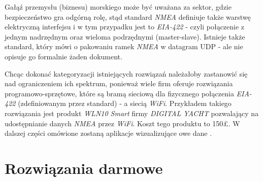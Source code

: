 \documentclass[skorowidz,skroty]{dyplomWEZUT}
\begin{document}
Gałąź przemysłu (biznesu) morskiego może być uważana za sektor, gdzie bezpieczeństwo gra odgórną rolę, stąd standard \textit{NMEA} definiuje także warstwę elektryczną interfejsu i w tym przypadku jest to \textit{EIA-422} - czyli połączenie z jednym nadrzędnym oraz wieloma podrzędnymi (master-slave). Istnieje także standard, który mówi o pakowaniu ramek \textit{NMEA} w datagram UDP - ale nie opisuje go formalnie żaden dokument.

Chcąc dokonać kategoryzacji istniejących rozwiązań należałoby zastanowić się nad ograniczeniem ich spektrum, ponieważ wiele firm oferuje rozwiązania programowo-sprzętowe, które są bramą sieciową dla fizycznego połączenia \textit{EIA-422} (zdefiniowanym przez standard) - a siecią \textit{WiFi}. Przykładem takiego rozwiązania jest produkt \textit{WLN10 Smart} firmy \textit{DIGITAL YACHT} \cite{DIGITALYACHT} pozwalający na udostępnianie danych \textit{NMEA} przez \textit{WiFi}. Koszt tego produktu to 150£. W dalszej części omówione zostaną aplikacje wizualizujące owe dane .

\section{Rozwiązania darmowe}\label{chap: Free solutions}
\end{document}
